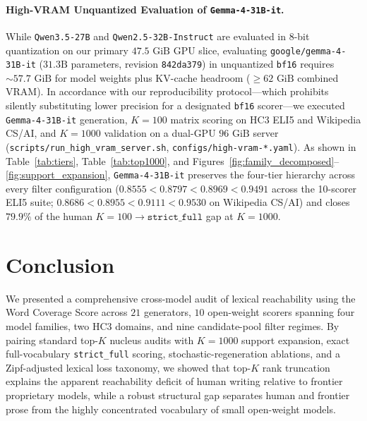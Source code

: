 \documentclass[11pt]{article}
\begin{document}
\paragraph{High-VRAM Unquantized Evaluation of \texttt{Gemma-4-31B-it}.}
While \texttt{Qwen3.5-27B} and \texttt{Qwen2.5-32B-Instruct} are evaluated in 8-bit quantization on our primary $47.5\text{ GiB}$ GPU slice, evaluating \texttt{google/gemma-4-31B-it} ($31.3\text{B}$ parameters, revision \texttt{842da379}) in unquantized \texttt{bf16} requires $\sim 57.7\text{ GiB}$ for model weights plus KV-cache headroom ($\ge 62\text{ GiB}$ combined VRAM). In accordance with our reproducibility protocol—which prohibits silently substituting lower precision for a designated \texttt{bf16} scorer—we executed \texttt{Gemma-4-31B-it} generation, $K=100$ matrix scoring on HC3 ELI5 and Wikipedia CS/AI, and $K=1000$ validation on a dual-GPU $96\text{ GiB}$ server (\texttt{scripts/run\_high\_vram\_server.sh}, \texttt{configs/high-vram-*.yaml}). As shown in Table~\ref{tab:tiers}, Table~\ref{tab:top1000}, and Figures~\ref{fig:family_decomposed}--\ref{fig:support_expansion}, \texttt{Gemma-4-31B-it} preserves the four-tier hierarchy across every filter configuration ($0.8555 < 0.8797 < 0.8969 < 0.9491$ across the 10-scorer ELI5 suite; $0.8686 < 0.8955 < 0.9111 < 0.9530$ on Wikipedia CS/AI) and closes $79.9\%$ of the human $K=100 \to \texttt{strict\_full}$ gap at $K=1000$.

\section{Conclusion}
We presented a comprehensive cross-model audit of lexical reachability using the Word Coverage Score across $21$ generators, $10$ open-weight scorers spanning four model families, two HC3 domains, and nine candidate-pool filter regimes. By pairing standard top-$K$ nucleus audits with $K=1000$ support expansion, exact full-vocabulary \texttt{strict\_full} scoring, stochastic-regeneration ablations, and a Zipf-adjusted lexical loss taxonomy, we showed that top-$K$ rank truncation explains the apparent reachability deficit of human writing relative to frontier proprietary models, while a robust structural gap separates human and frontier prose from the highly concentrated vocabulary of small open-weight models.
\end{document}
